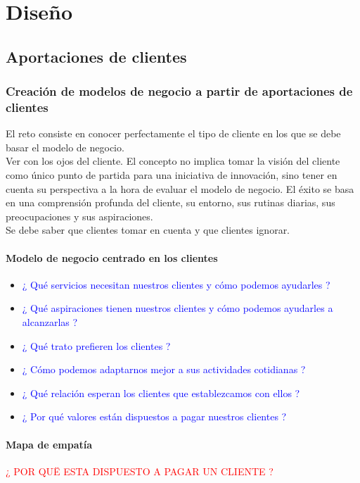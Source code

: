 \documentclass[11pt]{book}
\begin{document}
\part{Diseño}
\let\cleardoublepage\clearpage
\let\cleardoublepage\clearpage
\chapter{Aportaciones de clientes}
\section{Creación de modelos de negocio a partir de aportaciones de clientes}
El reto consiste en conocer perfectamente el tipo de cliente en los que se debe basar el modelo de negocio.\\
Ver con los ojos del cliente. El concepto no implica tomar la visión del cliente como único punto de partida para una iniciativa de innovación, sino tener en cuenta su perspectiva a la hora de evaluar el modelo de negocio. El éxito se basa en una comprensión profunda del cliente, su entorno, sus rutinas diarias, sus preocupaciones y sus aspiraciones.\\
Se debe saber que clientes tomar en cuenta y que clientes ignorar.
\subsection{Modelo de negocio centrado en los clientes}
\begin{itemize}
\item\textcolor{blue}{¿ Qué servicios necesitan nuestros clientes y cómo podemos ayudarles ?}
\item\textcolor{blue}{¿ Qué aspiraciones tienen nuestros clientes y cómo podemos ayudarles a alcanzarlas ?}
\item\textcolor{blue}{¿ Qué trato prefieren los clientes ?} 
\item\textcolor{blue}{¿ Cómo podemos adaptarnos mejor a sus actividades cotidianas ?}
\item\textcolor{blue}{¿ Qué relación esperan los clientes que establezcamos con ellos ?}
\item\textcolor{blue}{¿ Por qué valores están dispuestos a pagar nuestros clientes ?}
\end{itemize}
\subsection{Mapa de empatía}
\textcolor{red}{¿ POR QUË ESTA DISPUESTO A PAGAR UN CLIENTE ?}
\end{document}
